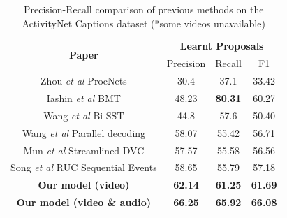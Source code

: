 \begin{table}[]
	\centering
	\begin{tabular}{|c|ccc|}
		\hline
		\multirow{2}{*}{\textbf{Paper}} & \multicolumn{3}{c|}{\textbf{Learnt Proposals}}                                             \\ \cline{2-4} 
		& \multicolumn{1}{c|}{Precision}      & \multicolumn{1}{c|}{Recall}         & F1             \\ \hline
		Zhou \textit{et al} \cite{zhou2017automatic} ProcNets                   & \multicolumn{1}{c|}{30.4}           & \multicolumn{1}{c|}{37.1}           & 33.42          \\ \hline
		Iashin \textit{et al} \cite{iashin2020better} BMT                             & \multicolumn{1}{c|}{48.23}          & \multicolumn{1}{c|}{\textbf{80.31}}          & 60.27          \\ \hline
		{Wang \textit{et al} \cite{wang2018bidirectional} Bi-SST}             & \multicolumn{1}{c|}{44.8}           & \multicolumn{1}{c|}{57.6}           & 50.40          \\ \hline
		Wang \textit{et al} \cite{wang2021endtoend} Parallel decoding                            & \multicolumn{1}{c|}{58.07}          & \multicolumn{1}{c|}{55.42}          & 56.71          \\ \hline
		{Mun \textit{et al} \cite{mun2019streamlined} Streamlined DVC}                 & \multicolumn{1}{c|}{57.57}          & \multicolumn{1}{c|}{55.58}          & 56.56          \\ \hline
		Song \textit{et al} \cite{songruc} RUC Sequential Events           & \multicolumn{1}{c|}{58.65}          & \multicolumn{1}{c|}{55.79}          & 57.18          \\ \hline
		\textbf{Our model (video)}              & \multicolumn{1}{c|}{\textbf{62.14}} & \multicolumn{1}{c|}{\textbf{61.25}} & \textbf{61.69} \\ \hline
		\textbf{Our model (video \& audio)}              & \multicolumn{1}{c|}{\textbf{66.25}} & \multicolumn{1}{c|}{\textbf{65.92}} & \textbf{66.08} \\ \hline
	\end{tabular}

	\centering
	\caption{Precision-Recall comparison of previous methods on the ActivityNet Captions dataset (*some videos unavailable)}  \label{tab: precision-recall-comparison}
\end{table}


